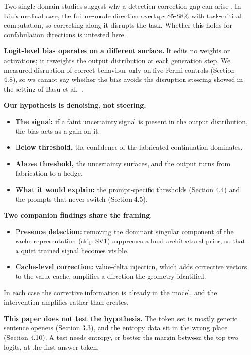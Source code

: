 \documentclass[11pt,letterpaper]{article}
\providecommand{\tightlist}{\setlength{\itemsep}{0pt}\setlength{\parskip}{0pt}}
\DeclareRobustCommand{\_}{\textunderscore\allowbreak}
\begin{document}
Two single-domain studies suggest why a detection-correction gap can arise \cite{basu2026interpretability,liu2026decodable}. In Liu's medical case, the failure-mode direction overlaps 85-88\% with task-critical computation, so correcting along it disrupts the task. Whether this holds for confabulation directions is untested here.

\textbf{Logit-level bias operates on a different surface.} It edits no weights or activations; it reweights the output distribution at each generation step. We measured disruption of correct behaviour only on five Fermi controls (Section 4.8), so we cannot say whether the bias avoids the disruption steering showed in the setting of Basu et al.~\cite{basu2026interpretability}.

\textbf{Our hypothesis is denoising, not steering.}

\begin{itemize}
\tightlist
\item
  \textbf{The signal:} if a faint uncertainty signal is present in the output distribution, the bias acts as a gain on it.
\item
  \textbf{Below threshold,} the confidence of the fabricated continuation dominates.
\item
  \textbf{Above threshold,} the uncertainty surfaces, and the output turns from fabrication to a hedge.
\item
  \textbf{What it would explain:} the prompt-specific thresholds (Section 4.4) and the prompts that never switch (Section 4.5).
\end{itemize}

\textbf{Two companion findings share the framing.}

\begin{itemize}
\tightlist
\item
  \textbf{Presence detection:} removing the dominant singular component of the cache representation (skip-SV1) suppresses a loud architectural prior, so that a quiet trained signal becomes visible.
\item
  \textbf{Cache-level correction:} value-delta injection, which adds corrective vectors to the value cache, amplifies a direction the geometry identified.
\end{itemize}

In each case the corrective information is already in the model, and the intervention amplifies rather than creates.

\textbf{This paper does not test the hypothesis.} The token set is mostly generic sentence openers (Section 3.3), and the entropy data sit in the wrong place (Section 4.10). A test needs entropy, or better the margin between the top two logits, at the first answer token.
\end{document}
